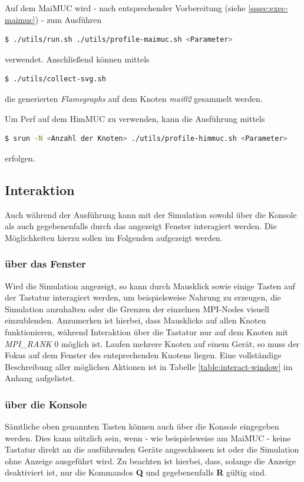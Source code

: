 \documentclass[course=erap]{aspdoc}
\begin{document}
Auf dem MaiMUC wird - nach entsprechender Vorbereitung (siehe \ref{sssec:exec-maimuc}) - zum Ausführen
\begin{lstlisting}[language=bash]
  $ ./utils/run.sh ./utils/profile-maimuc.sh <Parameter>
\end{lstlisting}
verwendet. Anschließend können mittels
\begin{lstlisting}[language=bash]
  $ ./utils/collect-svg.sh
\end{lstlisting}
die generierten \emph{Flamegraphs} auf dem Knoten \emph{mai02} gesammelt werden.

Um Perf auf dem HimMUC zu verwenden, kann die Ausführung mittels
\begin{lstlisting}[language=bash]
  $ srun -N <Anzahl der Knoten> ./utils/profile-himmuc.sh <Parameter>
\end{lstlisting}
erfolgen.

\subsection{Interaktion}
Auch während der Ausführung kann mit der Simulation sowohl über die Konsole als auch gegebenenfalls durch das angezeigt Fenster interagiert werden. Die Möglichkeiten hierzu sollen im Folgenden aufgezeigt werden.
\subsubsection{über das Fenster}
\label{sssec:interact-render}
Wird die Simulation angezeigt, so kann durch Mausklick sowie einige Tasten auf der Tastatur interagiert werden, um beispielsweise Nahrung zu erzeugen, die Simulation anzuhalten oder die Grenzen der einzelnen MPI-Nodes visuell einzublenden. Anzumerken ist hierbei, dass Mausklicks auf allen Knoten funktionieren, während Interaktion über die Tastatur nur auf dem Knoten mit \emph{MPI\_RANK} 0 möglich ist. Laufen mehrere Knoten auf einem Gerät, so muss der Fokus auf dem Fenster des entsprechenden Knotens liegen. Eine vollständige Beschreibung aller möglichen Aktionen ist in Tabelle \ref{table:interact-window} im Anhang aufgelistet.

\subsubsection{über die Konsole}
\label{sssec:interact-console}
Sämtliche oben genannten Tasten können auch über die Konsole eingegeben werden. Dies kann nützlich sein, wenn - wie beispielsweise am MaiMUC - keine Tastatur direkt an die ausführenden Geräte angeschlossen ist oder die Simulation ohne Anzeige ausgeführt wird. Zu beachten ist hierbei, dass, solange die Anzeige deaktiviert ist, nur die Kommandos \textbf{Q} und gegebenenfalls \textbf{R} gültig sind.
\end{document}
